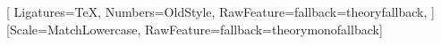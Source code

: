 \setmainfont{Charis SIL}[
  Ligatures=TeX,
  Numbers=OldStyle,
  RawFeature={fallback=theoryfallback},
]
\setmonofont{DejaVu Sans Mono}[Scale=MatchLowercase, RawFeature={fallback=theorymonofallback}]

%
%
%
\areaset[current]{430pt}{720pt}
\setlength{\marginparwidth}{0pt}
\setlength{\marginparsep}{0pt}

\let\eth\relax
\usepackage{amsmath,amsthm}
\usepackage{unicode-math}
\usepackage{array,booktabs,longtable}
\usepackage{ragged2e}


